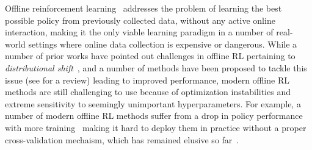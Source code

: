 Offline reinforcement learning~\citep{lange2012batch,levine2020offline} addresses the problem of learning the best possible policy from previously collected data, without any active online interaction, making it the only viable learning paradigm in a number of real-world settings where online data collection is expensive or dangerous.
While a number of prior works have pointed out challenges in offline RL pertaining to \emph{distributional shift}~\citep{fujimoto2018off,kumar2019stabilizing,levine2020offline}, and a number of methods have been proposed to tackle this issue (see \citep{levine2020offline} for a review) leading to improved performance, modern offline RL methods are still challenging to use because of optimization instabilities and extreme sensitivity to seemingly unimportant hyperparameters. For example, a number of modern offline RL methods suffer from a drop in policy performance with more training~\citep{kumar2021implicit} making it hard to deploy them in practice without a proper cross-validation mechaism, which has remained elusive so far~\citep{fu2021benchmarks}.


